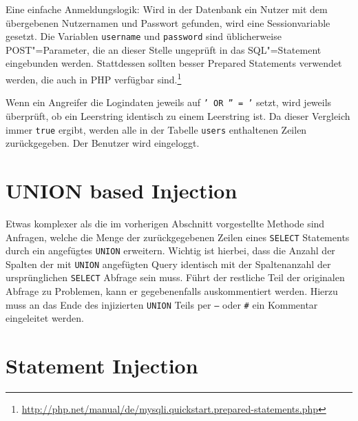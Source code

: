 \begin{listing}
\begin{margincap}
\inputminted[startinline]{php}{imports/login_1.php}
\caption[Verwundbare Anmeldungslogik]{Eine einfache Anmeldungslogik: Wird in der Datenbank ein Nutzer mit dem übergebenen Nutzernamen und Passwort gefunden, wird eine Sessionvariable gesetzt. Die Variablen \texttt{username} und \texttt{password} sind üblicherweise POST"=Parameter, die an dieser Stelle ungeprüft in das SQL"=Statement eingebunden werden. Stattdessen sollten besser Prepared Statements verwendet werden, die auch in PHP verfügbar sind.\footnote{\url{http://php.net/manual/de/mysqli.quickstart.prepared-statements.php}} }
\label{lst:login_query}
\end{margincap}
\end{listing}

Wenn ein Angreifer die Logindaten jeweils auf \texttt{' OR '' = '} setzt, wird jeweils überprüft, ob ein Leerstring identisch zu einem Leerstring ist. Da dieser Vergleich immer \texttt{true} ergibt, werden alle in der Tabelle \texttt{users} enthaltenen Zeilen zurückgegeben. Der Benutzer wird eingeloggt.

\section{UNION based Injection}

Etwas komplexer als die im vorherigen Abschnitt vorgestellte Methode sind Anfragen, welche die Menge der zurückgegebenen Zeilen eines \texttt{SELECT} Statements durch ein angefügtes \texttt{UNION} erweitern. Wichtig ist hierbei, dass die Anzahl der Spalten der mit \texttt{UNION} angefügten Query identisch mit der Spaltenanzahl der ursprünglichen  \texttt{SELECT} Abfrage sein muss. Führt der restliche Teil der originalen Abfrage zu Problemen, kann er gegebenenfalls auskommentiert werden. Hierzu muss an das Ende des injizierten \texttt{UNION} Teils per \texttt{--} oder \texttt{#} ein Kommentar eingeleitet werden.


\section{Statement Injection}

